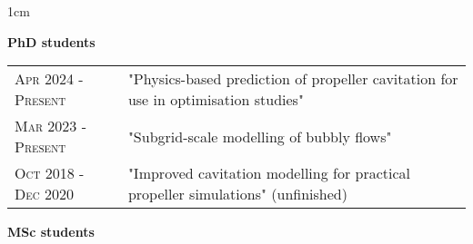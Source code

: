 \documentclass[a4paper,10pt]{article}
\begin{document}
\begin{minipage}{\textwidth}
\begin{adjustwidth}{}{1cm}

\textbf{PhD students}

{\renewcommand{\arraystretch}{1.2}
\begin{tabular}{l p{13.0cm}}
\textsc{Apr 2024 - Present} & "Physics-based prediction of propeller cavitation for use in optimisation studies" \\
\textsc{Mar 2023 - Present} & "Subgrid-scale modelling of bubbly flows" \\
\textsc{Oct 2018 - Dec 2020} & "Improved cavitation modelling for practical propeller simulations" (unfinished) \\
\end{tabular}
}

\textbf{MSc students}


\end{adjustwidth}
\end{minipage}
\end{document}
